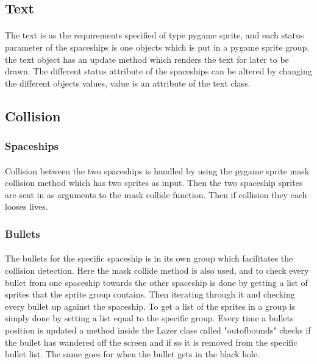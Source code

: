 \documentclass{article}
\begin{document}
\subsection{Text}
\paragraph{}
The text is as the requirements specified of type pygame sprite, and each status parameter of the spaceships is one objects which is put in a pygame sprite group. the text object has an update method which renders the text for later to be drawn. The different status attribute of the spaceships can be altered by changing the different objects values, value is an attribute of the text class.
\subsection{Collision}
\subsubsection{Spaceships}
\paragraph{}
Collision between the two spaceships is handled by using the pygame sprite mask collision method which has two sprites as input. Then the two spaceship sprites are sent in as arguments to the mask collide function. Then if collision they each looses lives.
\subsubsection{Bullets}
\paragraph{}
The bullets for the specific spaceship is in its own group which facilitates the collision detection. Here the mask collide method is also used, and to check every bullet from one spaceship towards the other spaceship is done by getting a list of sprites that the sprite group contains. Then iterating through it and checking every bullet up against the spaceship. To get a list of the sprites in a group is simply done by setting a list equal to the specific group.
Every time a bullets position is updated a method inside the Lazer class called "outofbounds" checks if the bullet has wandered off the screen and if so it is removed from the specific bullet list. The same goes for when the bullet gets in the black hole.
\end{document}
